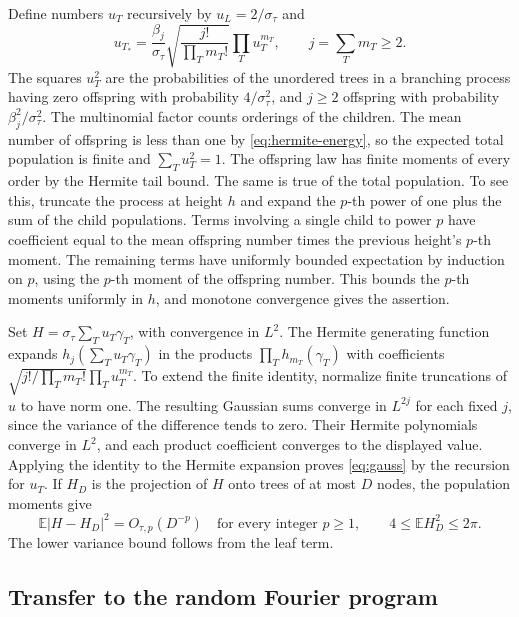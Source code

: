 \documentclass[11pt,letterpaper]{article}
\newcommand{\E}{\mathbb E}
\newcommand{\abs}[1]{\lvert #1\rvert}
\begin{document}
Define numbers \(u_T\) recursively by \(u_L=2/\sigma_\tau\) and
\[
 u_{T_*}=\frac{\beta_j}{\sigma_\tau}
      \sqrt{\frac{j!}{\prod_T m_T!}}\prod_T u_T^{m_T},
 \qquad j=\sum_T m_T\ge2.
\]
The squares \(u_T^2\) are the probabilities of the unordered trees
in a branching process having zero offspring with probability
\(4/\sigma_\tau^2\), and \(j\ge2\) offspring with probability \(\beta_j^2/\sigma_\tau^2\).
The multinomial factor counts orderings of the children. The mean
number of offspring is less than one by \eqref{eq:hermite-energy},
so the expected total population is finite and \(\sum_Tu_T^2=1\).
The offspring law has finite moments of every order by the Hermite
tail bound. The same is true of the total population. To see this,
truncate the process at height \(h\) and expand the \(p\)-th power of
one plus the sum of the child populations. Terms involving a single
child to power \(p\) have coefficient equal to the mean offspring
number times the previous height's \(p\)-th moment. The remaining
terms have uniformly bounded expectation by induction on \(p\),
using the \(p\)-th moment of the offspring number. This bounds the
\(p\)-th moments uniformly in \(h\), and monotone convergence gives
the assertion.

Set \(H=\sigma_\tau\sum_Tu_T\gamma_T\), with convergence in \(L^2\).
The Hermite generating function expands \(h_j(\sum_Tu_T\gamma_T)\)
in the products \(\prod_T h_{m_T}(\gamma_T)\) with coefficients
\(\sqrt{j!/\prod_Tm_T!}\prod_Tu_T^{m_T}\). To extend the finite identity,
normalize finite truncations of \(u\) to have norm one. The resulting
Gaussian sums converge in \(L^{2j}\) for each fixed \(j\), since the
variance of the difference tends to zero. Their Hermite polynomials
converge in \(L^2\), and each product coefficient converges to the
displayed value. Applying the identity to the Hermite expansion proves
\eqref{eq:gauss} by the recursion for \(u_T\). If \(H_D\) is the projection
of \(H\) onto trees of at most \(D\) nodes, the population moments give
\begin{equation}\label{eq:tree-tail}
 \E\abs{H-H_D}^2=O_{\tau,p}(D^{-p})\quad\text{for every integer }p\ge1,
 \qquad 4\le\E H_D^2\le2\pi.
\end{equation}
The lower variance bound follows from the leaf term.

\subsection{Transfer to the random Fourier program}
\end{document}
